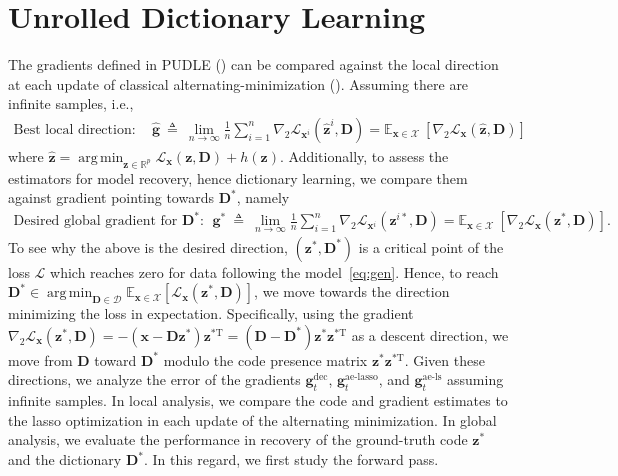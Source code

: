 \documentclass[10pt]{article} %
\newcommand{\R}{\mathbb{R}} %
\newcommand{\E}{\mathbb{E}} %
\newcommand{\D}{{\bm D}}
\newcommand{\x}{{\bm x}}
\newcommand{\z}{{\bm z}}
\newcommand{\g}{{\bm g}}
\newcommand{\Loss}{\mathcal{L}}
\newcommand{\X}{\mathcal{X}}
\newcommand{\Dcal}{\mathcal{D}}
\DeclareMathOperator*{\argmin}{arg\,min}
\begin{document}
\section{Unrolled Dictionary Learning}\label{sec:main}
%
The gradients defined in PUDLE () can be compared against the local direction at each update of classical alternating-minimization (). Assuming there are infinite samples, i.e.,
%
\begin{equation}\label{eq:glocal}
\begin{array}{c}
\text{Best local direction}:\quad \hat \g\ \triangleq\ \lim_{n \to \infty} \frac{1}{n} \sum_{i=1}^n \nabla_2 \Loss_{\x^i}(\hat \z^{i}, \D) = \E_{\x \in \X}\ [ \nabla_{2} \Loss_{\x}(\hat \z, \D)]
\end{array}
\end{equation}
%
where $\hat \z = \argmin_{\z \in \R^p} \Loss_{\x}(\z, \D) + h(\z)$. Additionally, to assess the estimators for model recovery, hence dictionary learning, we compare them against gradient pointing towards $\D^{\ast}$, namely
\begin{equation}\label{eq:gglobal}
\begin{array}{l}
\text{Desired global gradient for $\D^{\ast}$}:\ \ \g^{\ast}\ \triangleq\ \lim_{n \to \infty} \frac{1}{n} \sum_{i=1}^n \nabla_2 \Loss_{\x^i}(\z^{i\ast}, \D) = \E_{\x \in \X}\ [ \nabla_2 \Loss_{\x}(\z^{\ast}, \D)].
\end{array}
\end{equation}
To see why the above is the desired direction, $(\z^{\ast}, \D^{\ast})$ is a critical point of the loss $\Loss$ which reaches zero for data following the model~\eqref{eq:gen}. Hence, to reach $\D^{\ast} \in \argmin_{\D \in \Dcal} \E_{\x \in \X}[\Loss_{\x}(\z^{\ast}, \D)]$, we move towards the direction minimizing the loss in expectation. Specifically, using the gradient $\nabla_2 \Loss_{\x}(\z^{\ast}, \D) = - (\x - \D \z^{\ast}) \z^{\ast \text{T}} = (\D - \D^{\ast}) \z^{\ast} \z^{\ast \text{T}}$ as a descent direction, we move from $\D$ toward $\D^{\ast}$ modulo the code presence matrix $\z^{\ast} \z^{\ast \text{T}}$. Given these directions, we analyze the error of the gradients $\g_t^{\text{dec}}$, $\g_t^{\text{ae-lasso}}$, and $\g_t^{\text{ae-ls}}$ assuming infinite samples. In local analysis, we compare the code and gradient estimates to the lasso optimization in each update of the alternating minimization. In global analysis, we evaluate the performance in recovery of the ground-truth code $\z^{\ast}$ and the dictionary $\D^{\ast}$. In this regard, we first study the forward pass.
\end{document}
